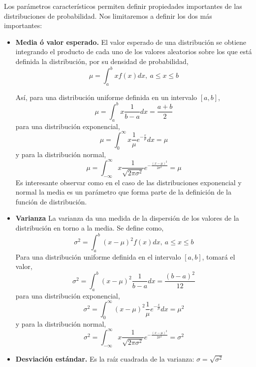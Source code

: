 Los parámetros característicos permiten definir propiedades importantes de las distribuciones de probabilidad. Nos limitaremos a definir los dos más importantes:
\begin{itemize}
\item \textbf{Media ó valor esperado.} El valor esperado de una distribución se obtiene integrando el producto de cada uno de los valores aleatorios sobre los que está definida la distribución, por su densidad de probabilidad,
\begin{equation*}
\mu = \int_a^b xf(x)dx, \ a\leqslant x \leqslant b
\end{equation*}

Así, para una distribución uniforme definida en un intervalo $[a,b]$,
\begin{equation*}
\mu = \int_a^b x\frac{1}{b-a}dx = \frac{a+b}{2}
\end{equation*}
para una distribución exponencial,
\begin{equation*}
\mu = \int_0^{\infty}x\frac{1}{\mu}e^{-\frac{x}{\mu}}dx = \mu
\end{equation*}
y para la distribución normal,
\begin{equation*}
\mu = \int_{-\infty}^{\infty}x \frac{1}{\sqrt{2\pi\sigma^2}}e^{-\frac{(x-\mu)^2}{2\sigma^2}}= \mu
\end{equation*}
Es interesante observar como en el caso de las distribuciones exponencial y normal la media es un parámetro que forma parte de la definición de la función de distribución.

\item \textbf{Varianza} La varianza da una medida de la dispersión de los valores de la distribución en torno a la media. Se define como,
\begin{equation*}
\sigma^2 = \int_a^b (x-\mu)^2f(x)dx, \ a\leqslant x \leqslant b
\end{equation*}
Para una distribución uniforme definida en el intervalo $[a,b]$, tomará el valor,
\begin{equation*}
\sigma^2 = \int_a^b (x-\mu)^2\frac{1}{b-a}dx = \frac{(b-a)^2}{12}
\end{equation*}
para una distribución exponencial,
\begin{equation*}
\sigma^2 = \int_0^{\infty}(x-\mu)^2\frac{1}{\mu}e^{-\frac{x}{\mu}}dx = \mu^2
\end{equation*}
y para la distribución normal,
\begin{equation*}
\sigma^2 = \int_{-\infty}^{\infty}x \frac{1}{\sqrt{2\pi\sigma^2}}e^{-\frac{(x-\mu)^2}{2\sigma^2}}= \sigma^2
\end{equation*}

\item \textbf{Desviación estándar.}  Es la raíz cuadrada de la varianza: $\sigma =\sqrt{\sigma^2}$  
\end{itemize}

